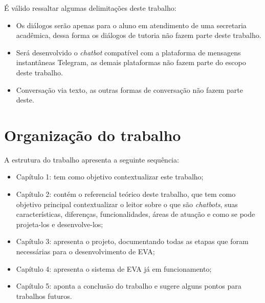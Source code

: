 É válido ressaltar algumas delimitações deste trabalho:

\begin{itemize}
    \item Os diálogos serão apenas para o aluno em atendimento de uma secretaria acadêmica, dessa forma os diálogos de tutoria não fazem parte deste trabalho.
    \item Será desenvolvido o \textit{chatbot} compatível com a plataforma de mensagens instantâneas Telegram, as demais plataformas não fazem parte do escopo deste trabalho.
    \item Conversação via texto, as outras formas de conversação não fazem parte deste.
\end{itemize}


\section{Organização do trabalho}

A estrutura do trabalho apresenta a seguinte sequência:

\begin{itemize}
    \item Capítulo 1: tem como objetivo contextualizar este trabalho; 
    \item Capítulo 2: contém o referencial teórico deste trabalho, que tem como objetivo principal contextualizar o leitor sobre o que são \textit{chatbots}, suas características, diferenças, funcionalidades, áreas de atuação e como se pode projeta-los e desenvolve-los;
    \item Capítulo 3: apresenta o projeto, documentando todas as etapas que foram necessárias para o desenvolvimento de EVA;
    \item Capítulo 4: apresenta o sistema de EVA já em funcionamento;
    \item Capítulo 5: aponta a conclusão do trabalho e sugere alguns pontos para trabalhos futuros.
\end{itemize}
